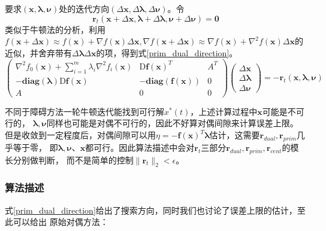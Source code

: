 \documentclass{article}
\begin{document}
要求$(\bm x,\bm\lambda,\bm\nu)$处的迭代方向$(\Delta\bm x,\Delta\bm\lambda,\Delta\bm\nu)$。令$$\bm r_t(\bm x+\Delta\bm x,\bm\lambda+\Delta\bm\lambda,\bm\nu+\Delta\bm\nu)=\bm 0$$
类似于牛顿法的分析，利用$f(\bm x+\Delta\bm x)\approx f(\bm x)+\nabla f(\bm x)\Delta\bm x,\nabla f(\bm x+\Delta \bm x)\approx\nabla f(\bm x)+\nabla^2f(\bm x)\Delta \bm x$的近似，并舍弃带有$\Delta\bm\lambda\Delta\bm x$的项，得到式\eqref{prim_dual_direction}。
\begin{equation}
    \label{prim_dual_direction}\begin{pmatrix}
    \nabla^2f_0(\bm x)+\sum\limits_{i=1}^m{\lambda_i\nabla^2f_i(\bm x)} & \text{D}\textbf{f}(\bm x)^T & A^T \\
    -\textbf{diag}(\bm\lambda)\text{D}\textbf{f}(\bm x) & -\textbf{diag}(\textbf{f}(\bm x)) & 0 \\
    A & 0 & 0
\end{pmatrix}\begin{pmatrix}
    \Delta\bm x\\
    \Delta\bm\lambda\\
    \Delta\bm\nu
\end{pmatrix}=-\bm r_t(\bm x,\bm \lambda,\bm\nu)\end{equation}

不同于障碍方法一轮牛顿迭代能找到可行解$x^*(t)$，上述计算过程中$\bm x$可能是不可行的，
$\bm\lambda,\bm\nu$同样也可能是对偶不可行的，因此不好算对偶间隙来计算误差上限。
但是收敛到一定程度后，对偶间隙可以用$\eta =-\bm f(\bm x)^T\bm\lambda$估计，这需要$\bm r_{dual},\bm r_{prim}$几乎等于零，
即$\bm\lambda,\bm\nu$、$\bm x$都可行。因此算法描述中会对$\bm r_t$三部分$\bm r_{dual},\bm r_{prim},\bm r_{cent}$的模长分别做判断，
而不是简单的控制$\|\bm r_t\|_2<\epsilon$。

\subsubsection{算法描述}
式\eqref{prim_dual_direction}给出了搜索方向，同时我们也讨论了误差上限的估计，至此可以给出
原始对偶方法：
\end{document}
